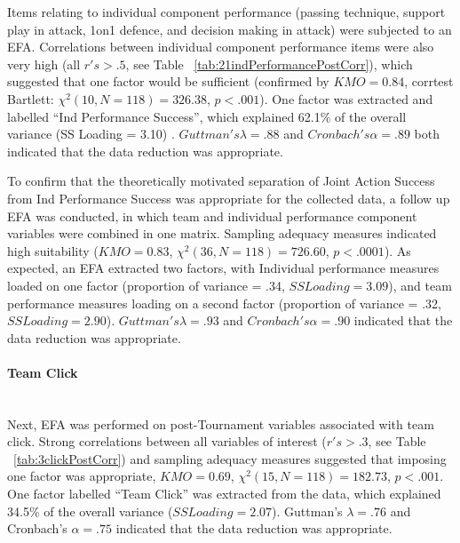 \documentclass[12pt]{report}
\newcommand{\myparagraph}[1]{\paragraph{#1}\mbox{}\\}
\begin{document}
{Items relating to individual component performance (passing technique, support play in attack, 1on1 defence, and decision making in attack) were subjected to an EFA.  Correlations between individual component performance items were also very high (all $r's > .5$, see Table ~\ref{tab:21indPerformancePostCorr}), which suggested that one factor would be sufficient (confirmed by $KMO =  0.84$, corrtest Bartlett: $\chi^2(10, N = 118) =  326.38$, $p < .001$).  One factor was extracted and labelled ``Ind Performance Success'', which explained 62.1\% of the overall variance (SS Loading = 3.10) .  $Guttman's \lambda =.88$ and $Cronbach's \alpha = .89$ both indicated that the data reduction was appropriate.

To confirm that the theoretically motivated separation of Joint Action Success from Ind Performance Success was appropriate for the collected data, a follow up EFA was conducted, in which team and individual performance component variables were combined in one matrix. Sampling adequacy measures indicated high suitability ($KMO = 0.83$, $\chi^2(36, N = 118) = 726.60$, $p < .0001$).  As expected, an EFA extracted two factors, with Individual performance measures loaded on one factor (proportion of variance = .34, $SS Loading = 3.09$), and team performance measures loading on a second factor (proportion of variance = .32, $SS Loading = 2.90$). $Guttman's \lambda =.93$ and $Cronbach's \alpha = .90$ indicated that the data reduction was appropriate.


\myparagraph{Team Click}
Next, EFA was performed on post-Tournament variables associated with team click. Strong correlations between all variables of interest ($r's > .3$, see Table ~\ref{tab:3clickPostCorr}) and sampling adequacy measures suggested that imposing one factor was appropriate, $KMO =  0.69$, $\chi^2(15, N = 118) = 182.73$, $p < .001$.  One factor labelled ``Team Click'' was extracted from the data, which explained 34.5\% of the overall variance ($SS Loading = 2.07$).  Guttman's $\lambda =.76$ and Cronbach's $\alpha = .75$ indicated that the data reduction was appropriate.



}
\end{document}
